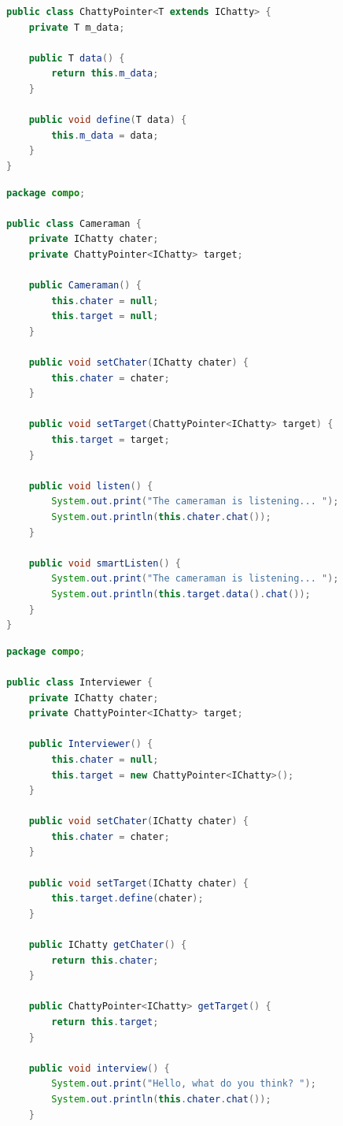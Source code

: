 \documentclass[11pt,a4paper,openany,oneside]{book}
\begin{document}
\begin{appendices}
\begin{lstlisting}[language=Java, frame=single, caption=ChattyPointer]
public class ChattyPointer<T extends IChatty> {
    private T m_data;

    public T data() {
        return this.m_data;
    }

    public void define(T data) {
        this.m_data = data;
    }
}
\end{lstlisting}

\clearpage

\begin{lstlisting}[language=Java, frame=single, caption=Cameraman]
package compo;

public class Cameraman {
    private IChatty chater;
    private ChattyPointer<IChatty> target;

    public Cameraman() {
        this.chater = null;
        this.target = null;
    }

    public void setChater(IChatty chater) {
        this.chater = chater;
    }

    public void setTarget(ChattyPointer<IChatty> target) {
        this.target = target;
    }

    public void listen() {
        System.out.print("The cameraman is listening... ");
        System.out.println(this.chater.chat());
    }

    public void smartListen() {
        System.out.print("The cameraman is listening... ");
        System.out.println(this.target.data().chat());
    }
}
\end{lstlisting}

\clearpage

\begin{lstlisting}[language=Java, frame=single, caption=Interviewer]
package compo;

public class Interviewer {
    private IChatty chater;
    private ChattyPointer<IChatty> target;

    public Interviewer() {
        this.chater = null;
        this.target = new ChattyPointer<IChatty>();
    }

    public void setChater(IChatty chater) {
        this.chater = chater;
    }

    public void setTarget(IChatty chater) {
        this.target.define(chater);
    }

    public IChatty getChater() {
        return this.chater;
    }

    public ChattyPointer<IChatty> getTarget() {
        return this.target;
    }

    public void interview() {
        System.out.print("Hello, what do you think? ");
        System.out.println(this.chater.chat());
    }


\end{lstlisting}
\end{appendices}
\end{document}
